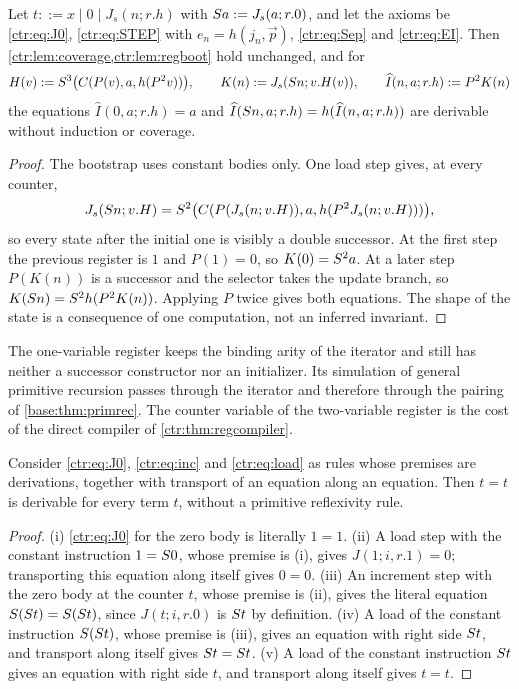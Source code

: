 \begin{proposition}\label{ctr:prop:scalarreg}
Let $t ::= x\mid 0\mid J_s(n;r.h)$ with $S a\mathrel{:=} J_s(a;r.0)$, and let the axioms be
\eqref{ctr:eq:J0}, \eqref{ctr:eq:STEP} with $e_n=h(j_n,\vec p)$, \eqref{ctr:eq:Sep} and
\eqref{ctr:eq:EI}. Then \cref{ctr:lem:coverage,ctr:lem:regboot} hold unchanged, and for
\[
 H(v)\mathrel{:=}S^3\bigl(C(P(v),a,h(P^2 v))\bigr),\qquad
 K(n)\mathrel{:=} J_s(S n;v.H(v)),\qquad
 \widehat I(n,a;r.h)\mathrel{:=} P^2K(n)
\]
the equations $\widehat I(0,a;r.h)=a$ and
$\widehat I(S n,a;r.h)=h(\widehat I(n,a;r.h))$ are derivable without induction or
coverage.
\end{proposition}
\begin{proof}
The bootstrap uses constant bodies only. One load step gives, at every counter,
\[
 J_s(S n;v.H)=S^2\bigl(C(P(J_s(n;v.H)),a,h(P^2J_s(n;v.H)))\bigr),
\]
so every state after the initial one is visibly a double successor. At the first step the
previous register is $1$ and $P(1)=0$, so $K(0)=S^2 a$. At a later step $P(K(n))$ is a
successor and the selector takes the update branch, so $K(S n)=S^2h(P^2K(n))$.
Applying $P$ twice gives both equations. The shape of the state is a consequence of one
computation, not an inferred invariant.
\end{proof}

The one-variable register keeps the binding arity of the iterator and still has neither a
successor constructor nor an initializer. Its simulation of general primitive recursion
passes through the iterator and therefore through the pairing of \cref{base:thm:primrec}.
The counter variable of the two-variable register is the cost of the direct compiler of
\cref{ctr:thm:regcompiler}.

\begin{proposition}\label{ctr:prop:regrefl}
Consider \eqref{ctr:eq:J0}, \eqref{ctr:eq:inc} and \eqref{ctr:eq:load} as rules whose
premises are derivations, together with transport of an equation along an equation. Then
$t=t$ is derivable for every term $t$, without a primitive reflexivity rule.
\end{proposition}
\begin{proof}
(i) \eqref{ctr:eq:J0} for the zero body is literally $1=1$. (ii) A load step with the
constant instruction $1=S 0$, whose premise is (i), gives $J(1;i,r.1)=0$; transporting
this equation along itself gives $0=0$. (iii) An increment step with the zero body at the
counter $t$, whose premise is (ii), gives the literal equation
$S(S t)=S(S t)$, since $J(t;i,r.0)$ is $S t$ by definition. (iv) A load of the
constant instruction $S(S t)$, whose premise is (iii), gives an equation with right
side $S t$, and transport along itself gives $S t=S t$. (v) A load of the constant
instruction $S t$ gives an equation with right side $t$, and transport along itself gives
$t=t$.
\end{proof}

